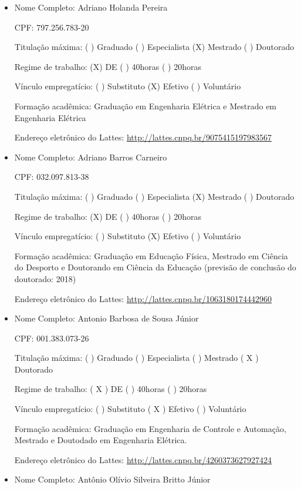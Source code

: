 \documentclass{paper}
\def\web#1{\href{#1}{#1}}
\begin{document}
\begin{itemize}

\item Nome Completo: Adriano Holanda Pereira

 CPF: 797.256.783-20

 Titulação máxima: (  ) Graduado (  ) Especialista  (X) Mestrado ( ) Doutorado

 Regime de trabalho: (X) DE ( ) 40horas ( ) 20horas

 Vínculo empregatício: (  ) Substituto (X) Efetivo  (  ) Voluntário

 Formação acadêmica: Graduação em Engenharia Elétrica e Mestrado em Engenharia Elétrica

 Endereço eletrônico do Lattes: \web{http://lattes.cnpq.br/9075415197983567}


\item Nome Completo: Adriano Barros Carneiro

 CPF: 032.097.813-38

 Titulação máxima: (  ) Graduado (  ) Especialista  (X) Mestrado ( ) Doutorado

 Regime de trabalho: (X) DE ( ) 40horas ( ) 20horas

 Vínculo empregatício: (  ) Substituto (X) Efetivo  (  ) Voluntário

 Formação acadêmica: Graduação em Educação Física, Mestrado em Ciência do Desporto e Doutorando em Ciência da Educação (previsão de conclusão do doutorado: 2018)

 Endereço eletrônico do Lattes: \web{http://lattes.cnpq.br/1063180174442960}

 
\item Nome Completo: Antonio Barbosa de Sousa Júnior

 CPF: 001.383.073-26

 Titulação máxima: (  ) Graduado  (  ) Especialista  (  ) Mestrado ( X ) Doutorado

 Regime de trabalho: ( X ) DE  (  ) 40horas (  ) 20horas

 Vínculo empregatício: (  ) Substituto  ( X ) Efetivo  (  ) Voluntário

 Formação acadêmica: Graduação em Engenharia de Controle e Automação, Mestrado e Doutodado em Engenharia Elétrica.

 Endereço eletrônico do Lattes: \web{http://lattes.cnpq.br/4260373627927424}

\item Nome Completo: Antônio Olívio Silveira Britto Júnior


\end{itemize}
\end{document}
